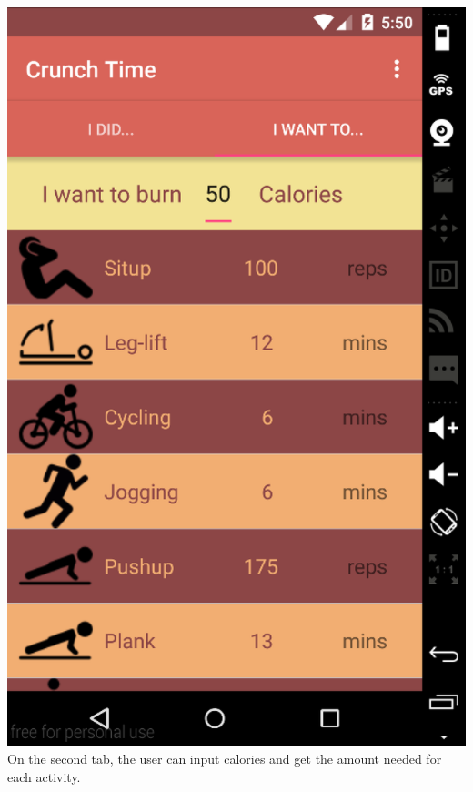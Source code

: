 \documentclass[11pt]{article}
\begin{document}
\includegraphics[scale=0.3]{shot4.png}\\
On the second tab, the user can input calories and get the amount needed for each activity.\\
\end{document}

